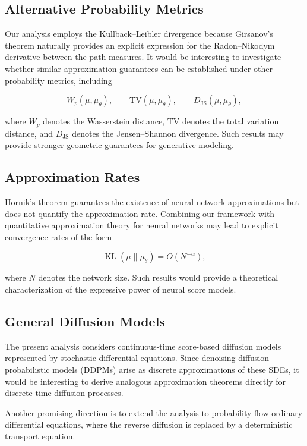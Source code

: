 \documentclass[11pt]{article}
\DeclareMathOperator{\KL}{KL}
\begin{document}
\subsection{Alternative Probability Metrics}

Our analysis employs the Kullback--Leibler divergence because Girsanov's theorem naturally provides an explicit expression for the Radon--Nikodym derivative between the path measures. It would be interesting to investigate whether similar approximation guarantees can be established under other probability metrics, including

\[
W_p(\mu,\mu_\theta), \qquad
\mathrm{TV}(\mu,\mu_\theta), \qquad
D_{\mathrm{JS}}(\mu,\mu_\theta),
\]

where $W_p$ denotes the Wasserstein distance, $\mathrm{TV}$ denotes the total variation distance, and $D_{\mathrm{JS}}$ denotes the Jensen--Shannon divergence. Such results may provide stronger geometric guarantees for generative modeling.

\subsection{Approximation Rates}

Hornik's theorem guarantees the existence of neural network approximations but does not quantify the approximation rate. Combining our framework with quantitative approximation theory for neural networks may lead to explicit convergence rates of the form

\[
\KL(\mu\|\mu_\theta)
=
O(N^{-\alpha}),
\]

where $N$ denotes the network size. Such results would provide a theoretical characterization of the expressive power of neural score models.

\subsection{General Diffusion Models}

The present analysis considers continuous-time score-based diffusion models represented by stochastic differential equations. Since denoising diffusion probabilistic models (DDPMs) arise as discrete approximations of these SDEs, it would be interesting to derive analogous approximation theorems directly for discrete-time diffusion processes.

Another promising direction is to extend the analysis to probability flow ordinary differential equations, where the reverse diffusion is replaced by a deterministic transport equation.
\end{document}
